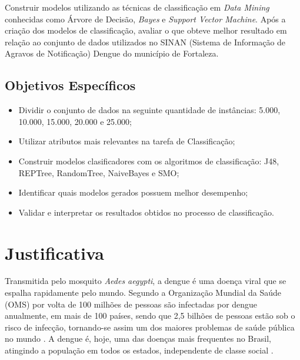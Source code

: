 \documentclass[
	12pt,				%
	openright,			%
	oneside,	
	a4paper,				%
	english,				%
	brazil				%
]{abntex2/abntex2} %
\begin{document}
		Construir modelos utilizando as técnicas de classificação em \textit{Data Mining} conhecidas como Árvore de Decisão, \textit{Bayes} e \textit{Support Vector Machine}. Após a criação dos modelos de classificação, avaliar o que obteve melhor resultado em relação ao conjunto de dados utilizados no SINAN (Sistema de Informação de Agravos de Notificação) Dengue do município de Fortaleza. 
		
		\subsection{Objetivos Específicos}
		
		\begin{itemize}
			\item Dividir o conjunto de dados na seguinte quantidade de instâncias: 5.000, 10.000, 15.000, 20.000 e 25.000;
			
			\item Utilizar atributos mais relevantes na tarefa de Classificação;
			
			\item Construir modelos clasificadores com os algoritmos de classificação: J48, REPTree, RandomTree, NaiveBayes e SMO;

			\item Identificar quais modelos gerados possuem melhor desempenho;
			
			\item Validar e interpretar os resultados obtidos no processo de classificação.
		\end{itemize}
		
	\section{Justificativa}
	

	Transmitida pelo mosquito \textit{Aedes aegypti}, a dengue é uma doença viral que se espalha rapidamente pelo mundo. Segundo a Organização Mundial da Saúde (OMS) por volta de 100 milhões de pessoas são infectadas por dengue anualmente, em mais de 100 países, sendo que 2,5 bilhões de pessoas estão sob o risco de infecção, tornando-se assim um dos maiores problemas de saúde pública no mundo \cite{bhatt:2013}. A dengue é, hoje, uma das doenças mais frequentes no Brasil, atingindo a população em todos os estados, independente de classe social \cite{saude:2008}.
	
\end{document}

